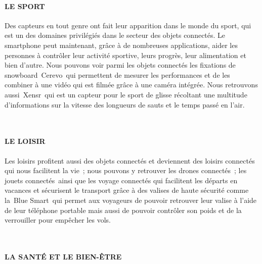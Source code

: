 \documentclass[12pt,a4paper]{report}
\begin{document}
\noindent 
\paragraph{LE SPORT}

\noindent \begin{flushleft}
	Des capteurs en tout genre ont fait leur apparition dans le monde du sport, qui est un des domaines privil\'{e}gi\'{e}s dans le secteur des objets connect\'{e}s. Le smartphone peut maintenant, gr\^{a}ce \`{a} de nombreuses applications, aider les personnes \`{a} contr\^{o}ler leur activit\'{e} sportive, leurs progr\`{e}s, leur alimentation et bien d'autre. Nous pouvons voir parmi les objets connect\'{e}s les fixations de snowboard~Cerevo~qui permettent de mesurer les performances et de les combiner \`{a} une vid\'{e}o qui est film\'{e}e gr\^{a}ce \`{a} une cam\'{e}ra int\'{e}gr\'{e}e. Nous retrouvons aussi~Xensr~qui est un capteur pour le sport de glisse r\'{e}coltant une multitude d'informations sur la vitesse des longueurs de sauts et le temps pass\'{e} en l'air.
	
	\noindent ~
\end{flushleft}

\noindent 
\paragraph{LE LOISIR}

\noindent \begin{flushleft}
	Les loisirs profitent aussi des objets connect\'{e}s et deviennent des loisirs connect\'{e}s qui nous facilitent la vie~; nous pouvons y retrouver les drones connect\'{e}s~; les jouets connect\'{e}s~ainsi que les voyage connect\'{e}s qui facilitent les d\'{e}parts en vacances et s\'{e}curisent le transport gr\^{a}ce \`{a} des valises de haute s\'{e}curit\'{e} comme la~Blue Smart~qui permet aux voyageurs de pouvoir retrouver leur valise \`{a} l'aide de leur t\'{e}l\'{e}phone portable mais aussi de pouvoir contr\^{o}ler son poids et de la verrouiller pour emp\^{e}cher les vols.
	
	\noindent ~
\end{flushleft}

\noindent 
\paragraph{LA SANT\'{E} ET LE BIEN-\^{E}TRE}
\end{document}
